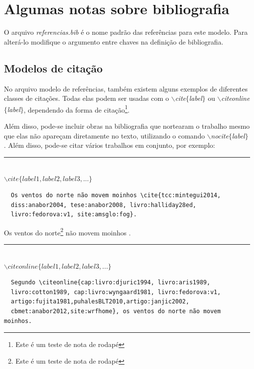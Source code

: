 \documentclass[oneside,openright,12pt]{ufsm_2015} %
\begin{document}
\chapter{Algumas notas sobre bibliografia}


\par O arquivo \textit{referencias.bib} é o nome padrão das referências para este modelo. Para alterá-lo modifique o argumento entre chaves na definição de bibliografia.

   \section{Modelos de citação}
      \par No arquivo modelo de referências, também existem alguns exemplos de diferentes classes de citações. Todas elas podem ser usadas com o \textit{$\backslash$cite$\{$label$\}$} ou \textit{$\backslash$citeonline$\{$label$\}$}, dependendo da forma de citação\footnote{Este é um teste de nota de rodapé}.

  \par Além disso, pode-se incluir obras na bibliografia que nortearam o trabalho mesmo que elas não apareçam diretamente no texto, utilizando o comando \textit{$\backslash$nocite$\{$label$\}$}. Além disso, pode-se citar vários trabalhos em conjunto, por exemplo:
  
  \begin{center}\rule{0.5\textwidth}{1pt}\\$\backslash cite\{label1,label2,label3,...\}$\end{center}

  \begin{verbatim}
  Os ventos do norte não movem moinhos \cite{tcc:mintegui2014, 
  diss:anabor2004, tese:anabor2008, livro:halliday28ed, 
  livro:fedorova:v1, site:amsglo:fog}.
  \end{verbatim}
      
  \par Os ventos do norte\footnote{Este é um teste de nota de rodapé} não movem moinhos \cite{tcc:mintegui2014,diss:anabor2004,tese:anabor2008,livro:halliday28ed,livro:fedorova:v1,site:amsglo:fog}.
        
        \begin{center}\rule{0.5\textwidth}{1pt}\\$\backslash citeonline\{label1,label2,label3,...\}$\end{center}
        
  \begin{verbatim}
  Segundo \citeonline{cap:livro:djuric1994, livro:aris1989, 
  livro:cotton1989, cap:livro:wyngaard1981, livro:fedorova:v1, 
  artigo:fujita1981,puhalesBLT2010,artigo:janjic2002,
  cbmet:anabor2012,site:wrfhome}, os ventos do norte não movem moinhos.
  \end{verbatim}
            
\end{document}
